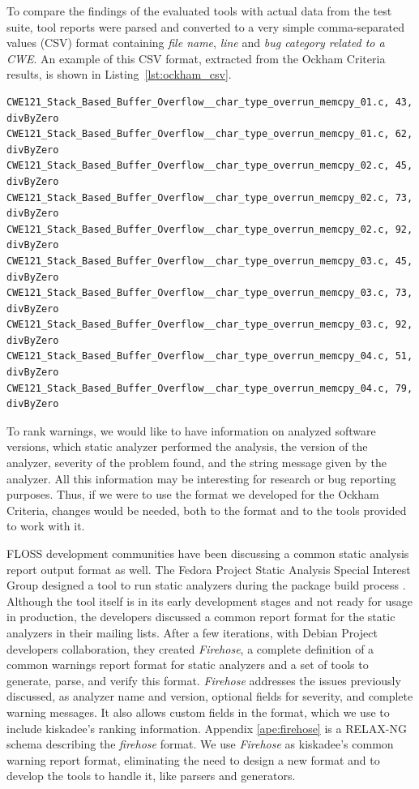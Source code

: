 To compare the findings of the evaluated tools with actual data from the test suite,
tool reports were parsed and converted to a very simple comma-separated values
(CSV) format containing \textit{file name}, \textit{line} and \textit{bug category
related to a CWE}. An example of this CSV format, extracted from the Ockham
Criteria results, is shown in Listing~\ref{lst:ockham_csv}.

\lstset{language=Python}
\begin{lstlisting}[caption={Ockham Criteria CSV bug report example},label={lst:ockham_csv}]
CWE121_Stack_Based_Buffer_Overflow__char_type_overrun_memcpy_01.c, 43, divByZero
CWE121_Stack_Based_Buffer_Overflow__char_type_overrun_memcpy_01.c, 62, divByZero
CWE121_Stack_Based_Buffer_Overflow__char_type_overrun_memcpy_02.c, 45, divByZero
CWE121_Stack_Based_Buffer_Overflow__char_type_overrun_memcpy_02.c, 73, divByZero
CWE121_Stack_Based_Buffer_Overflow__char_type_overrun_memcpy_02.c, 92, divByZero
CWE121_Stack_Based_Buffer_Overflow__char_type_overrun_memcpy_03.c, 45, divByZero
CWE121_Stack_Based_Buffer_Overflow__char_type_overrun_memcpy_03.c, 73, divByZero
CWE121_Stack_Based_Buffer_Overflow__char_type_overrun_memcpy_03.c, 92, divByZero
CWE121_Stack_Based_Buffer_Overflow__char_type_overrun_memcpy_04.c, 51, divByZero
CWE121_Stack_Based_Buffer_Overflow__char_type_overrun_memcpy_04.c, 79, divByZero
\end{lstlisting}

To rank warnings, we would like to have information on analyzed software
versions, which static analyzer performed the analysis, the version of the
analyzer, severity of the problem found, and the string message given by the
analyzer. All this information may be interesting for research or bug reporting
purposes. Thus, if we were to use the format we developed for the Ockham Criteria,
changes would be needed, both to the format and to the tools provided to work
with it.

FLOSS development communities have been discussing a common static analysis
report output format as well. The Fedora Project Static Analysis Special Interest Group
\cite{fedora:static:sig} designed a tool to run static analyzers during the
package build process \cite{fedora:mockwithanalysis}.  Although the tool itself
is in its early development stages and not ready for usage in production, the
developers discussed \cite{fedora:mlist} a common report format for the static
analyzers in their mailing lists. After a few iterations, with Debian Project
developers collaboration, they created \textit{Firehose}, a complete definition
of a common warnings report format for static analyzers and a set of tools to
generate, parse, and verify this format.
\textit{Firehose} addresses the issues previously discussed, as analyzer name
and version, optional fields for severity, and complete warning messages. It also allows custom fields in the format, which we use to include kiskadee's ranking information.
Appendix \ref{ape:firehose} is a RELAX-NG schema describing the
\textit{firehose} format.
We use \textit{Firehose} as kiskadee's
common warning report format, eliminating the need to design a new format and
to develop the tools to handle it, like parsers and generators.

